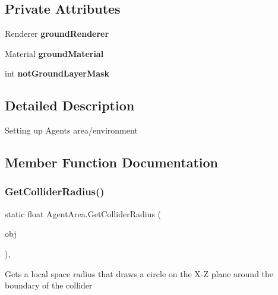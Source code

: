 \subsection*{Private Attributes}
\begin{DoxyCompactItemize}
\item 
\mbox{\label{class_agent_area_ae7d2b4aed875ee4bcc31c2c96d5068ef}} 
Renderer {\bfseries ground\+Renderer}
\item 
\mbox{\label{class_agent_area_adf1c2adaeb49de66e615380928412b58}} 
Material {\bfseries ground\+Material}
\item 
\mbox{\label{class_agent_area_a7c0ed06093e89e910aab5eeed1442f2f}} 
int {\bfseries not\+Ground\+Layer\+Mask}
\end{DoxyCompactItemize}


\subsection{Detailed Description}
Setting up Agents area/environment 



\subsection{Member Function Documentation}
\mbox{\label{class_agent_area_a7dc794f33c82a1c00914d3171e73d034}} 
\subsubsection{\texorpdfstring{GetColliderRadius()}{GetColliderRadius()}}
{\footnotesize\ttfamily static float Agent\+Area.\+Get\+Collider\+Radius (\begin{DoxyParamCaption}\item[{Game\+Object}]{obj }\end{DoxyParamCaption})\hspace{0.3cm}{\ttfamily [static]}, {\ttfamily [private]}}



Gets a local space radius that draws a circle on the X-\/Z plane around the boundary of the collider 


